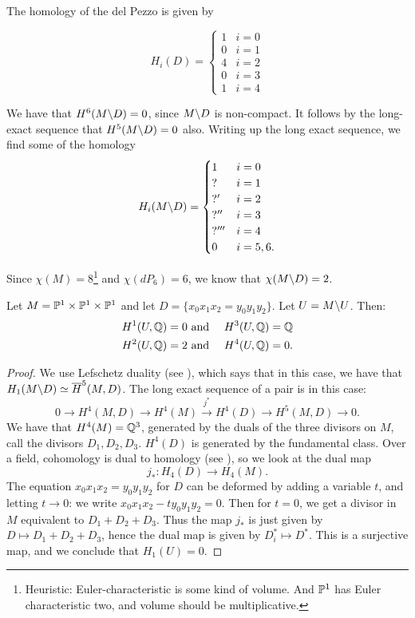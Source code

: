\documentclass[11pt, english]{article}
\begin{document}
The homology of the del Pezzo is given by 

\[
H_i(D) = \begin{cases}
1 & i = 0 \\
0 & i = 1 \\
4 & i = 2 \\
0 & i = 3 \\
1 & i = 4
\end{cases}
\]

We have that $H^6(M \backslash D)=0$, since $M\backslash D$ is non-compact. It follows by the long-exact sequence that $H^5(M \backslash D)=0$ also. Writing up the long exact sequence, we find some of the homology 
\[
H_i(M \backslash D) = \begin{cases}
1 & i = 0 \\
? & i = 1 \\
?' & i = 2 \\
?'' & i = 3 \\
?''' & i = 4 \\
0 & i = 5,6.
\end{cases}
\]

Since $\chi(M) = 8$\footnote{Heuristic: Euler-characteristic is some kind of volume. And $\mathbb{P}^1$ has Euler characteristic two, and volume should be multiplicative.} and $\chi(dP_6)=6$, we know that $\chi(M \backslash D) = 2$.

\begin{prop}
Let $M = \mathbb{P}^1 \times \mathbb{P}^1 \times \mathbb{P}^1$ and let $D = \{ x_0x_1x_2=y_0y_1y_2 \}$. Let $U = M \backslash U$. Then:
\begin{align*}
H^1(U, \mathbb{Q}) = 0 & \text{ and } & H^3(U,\mathbb{Q})=\mathbb{Q} \\
H^2(U, \mathbb{Q}) = 2 & \text{ and } & H^4(U,\mathbb{Q})=0.
\end{align*}
\end{prop}
\begin{proof}
We use Lefschetz duality (see \cite[Chapter 6, p.~297]{spanier_topology}), which says that in this case, we have that $H_1(M \backslash D) \simeq \overline H^5(M,D)$.
The long exact sequence of a pair is in this case:
$$
0 \to H^4(M,D) \to H^4(M) \xrightarrow{j^\ast} H^4(D) \to H^5(M,D) \to 0.
$$
We have that $H^4(M)= \mathbb{Q}^3$, generated by the duals of the three divisors on $M$, call the divisors $D_1,D_2,D_3$. $H^4(D)$ is generated by the fundamental class. Over a field, cohomology is dual to homology (see \cite[Chapter 3, p.~195]{hatcher_algtop}), so we look at the dual map
$$
j_\ast: H_4(D) \to H_4(M).
$$
The equation $x_0x_1x_2=y_0y_1y_2$ for $D$ can be deformed by adding a variable $t$, and letting $t \to 0$: we write $x_0x_1x_2-ty_0y_1y_2=0$. Then for $t=0$, we get a divisor in $M$ equivalent to $D_1+D_2+D_3$. Thus the map $j_\ast$ is just given by $D \mapsto D_1+D_2+D_3$, hence the dual map is given by $D_i^\ast \mapsto D^\ast$. This is a surjective map, and we conclude that $H_1(U)=0$.
\end{proof}
\end{document}
